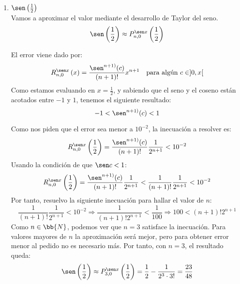 \begin{ejercicio}
\begin{enumerate}
        
        \item $\sen\left( \frac{1}{2} \right)$\\
        Vamos a aproximar el valor mediante el desarrollo de Taylor del seno.
        $$\sen\left( \frac{1}{2} \right) \approx P_{n, 0}^{\sen x}\left(\frac{1}{2}\right)$$

        El error viene dado por:
        \begin{equation*}
            R_{n,0}^{\sen x}\left(x\right) = \frac{\sen^{n+1)} (c)}{(n+1)!}x^{n+1} \quad \text{para algún } c\in ]0, x[
        \end{equation*}
        Como estamos evaluando en $x=\frac{1}{2}$, y sabiendo que el seno y el coseno están acotados entre $-1$ y $1$, tenemos el siguiente resultado:
        \begin{equation*}
            -1 < \sen^{n+1)} (c) < 1
        \end{equation*}

        Como nos piden que el error sea menor a $10^{-2}$, la inecuación a resolver es:
        \begin{equation*}
            R_{n,0}^{\sen x}\left(\frac{1}{2}\right) = \frac{\sen^{n+1)} (c)}{(n+1)!}\frac{1}{2^{n+1}} < 10^{-2}
        \end{equation*}
        Usando la condición de que $\sen c < 1$:
        \begin{equation*}
            R_{n,0}^{\sen x}\left(\frac{1}{2}\right) = \frac{\sen^{n+1)} (c)}{(n+1)!}\frac{1}{2^{n+1}} < \frac{1}{(n+1)!}\frac{1}{2^{n+1}}  < 10^{-2}
        \end{equation*}
        Por tanto, resuelvo la siguiente inecuación para hallar el valor de $n$:
        \begin{equation*}
            \frac{1}{(n+1)!}\frac{1}{2^{n+1}}  < 10^{-2} \Longrightarrow \frac{1}{(n+1)!2^{n+1}} < \frac{1}{100} \Longrightarrow 100 < (n+1)!2^{n+1}
        \end{equation*}
        Como $n\in \bb{N}$, podemos ver que $n=3$ satisface la inecuación. Para valores mayores de $n$ la aproximación será mejor, pero para obtener error menor al pedido no es necesario más. Por tanto, con $n=3$, el resultado queda:
        $$\sen\left( \frac{1}{2} \right) \approx P_{3, 0}^{\sen x}\left(\frac{1}{2}\right) = \frac{1}{2} - \frac{1}{2^3 \cdot 3!} = \frac{23}{48}$$

        \begin{comment}
        Vamos a aproximar el valor mediante el desarrollo de Taylor de $f(x)=\ln \left(\frac{1+x}{1-x}\right) = \ln (1+x)-\ln(1-x)$. Tomando $g(x)=\ln (1+x),\;h(x)=\ln(1-x)$, entonces $f(x)=g(x)-h(x)$.
        $$\ln{3}\approx P_{n, 0}^{f}\left(\frac{1}{2}\right)$$


\end{comment}
\end{enumerate}
\end{ejercicio}
